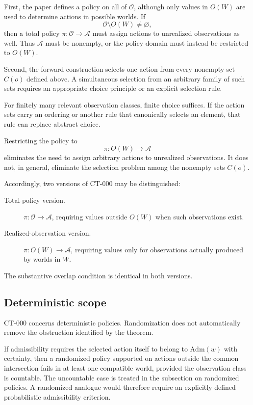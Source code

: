 \documentclass[11pt]{article}
\theoremstyle{definition}
\theoremstyle{remark}
\newcommand{\worlds}{W}
\newcommand{\acts}{\mathcal{A}}
\newcommand{\obs}{\mathcal{O}}
\newcommand{\admissible}{\mathrm{Adm}}
\begin{document}
First, the paper defines a policy on all of $\obs$, although only values in
$O(\worlds)$ are used to determine actions in possible worlds. If
\[
  \obs\setminus O(\worlds)\neq\varnothing,
\]
then a total policy $\pi:\obs\to\acts$ must assign actions to unrealized
observations as well. Thus $\acts$ must be nonempty, or the policy domain must
instead be restricted to $O(\worlds)$.

Second, the forward construction selects one action from every nonempty set
$C(o)$ defined above.
A simultaneous selection from an arbitrary family of such sets requires an
appropriate choice principle or an explicit selection rule.

For finitely many relevant observation classes, finite choice suffices.
If the action sets carry an ordering or another rule that canonically selects
an element, that rule can replace abstract choice.

Restricting the policy to
\[
  \pi:O(\worlds)\to\acts
\]
eliminates the need to assign arbitrary actions to unrealized observations.
It does not, in general, eliminate the selection problem among the nonempty
sets $C(o)$.

Accordingly, two versions of CT-000 may be distinguished:

\begin{description}
  \item[Total-policy version.]
  $\pi:\obs\to\acts$, requiring values outside $O(\worlds)$ when such
  observations exist.

  \item[Realized-observation version.]
  $\pi:O(\worlds)\to\acts$, requiring values only for observations actually
  produced by worlds in $\worlds$.
\end{description}

The substantive overlap condition is identical in both versions.

\subsection{Deterministic scope}

CT-000 concerns deterministic policies. Randomization does not automatically
remove the obstruction identified by the theorem.

If admissibility requires the selected action itself to belong to
$\admissible(w)$ with certainty, then a randomized policy supported on actions
outside the common intersection fails in at least one compatible world,
provided the observation class is countable. The uncountable case is treated
in the subsection on randomized policies.
A randomized analogue would therefore require an explicitly defined
probabilistic admissibility criterion.
\end{document}
